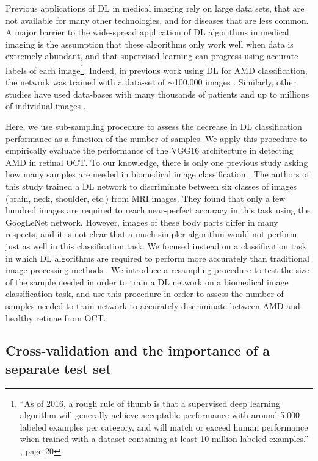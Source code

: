 Previous applications of DL in medical imaging rely on large data sets, that
are not available for many other technologies, and for diseases that are less
common. A major barrier to the wide-spread application of DL algorithms in
medical imaging is the assumption that these algorithms only work well when
data is extremely abundant, and that supervised learning can progress using
accurate labels of each image\footnote{``As of 2016, a rough rule of thumb is
that a supervised deep learning algorithm will generally achieve acceptable
performance with around 5,000 labeled examples per category, and will match or
exceed human performance when trained with a dataset containing at least 10
million labeled examples.'' \citep{Goodfellow-et-al-2016}, page 20}. Indeed, in
previous work using DL for AMD classification, the network was trained with a
data-set of $\sim$100,000 images \citep{lee2017deep}. Similarly, other studies
have used data-bases with many thousands of patients and up to millions of
individual images \citep{Kermany2018-bq}.

Here, we use sub-sampling procedure to assess the decrease in DL
classification performance as a function of the number of samples. We apply this
procedure to empirically evaluate the performance of the VGG16 architecture in
detecting AMD in retinal OCT. To our knowledge, there is only one previous
study asking how many samples are needed in biomedical image classification
\citep{Cho2015data_size}. The authors of this study trained a DL network to
discriminate between six classes of images (brain, neck, shoulder, etc.) from
MRI images. They found that only a few hundred images are required to reach
near-perfect accuracy in this task using the GoogLeNet network. However, images
of these body parts differ in many respects, and it is not clear that a much
simpler algorithm would not perform just as well in this classification task.
We focused instead on a classification task in which DL algorithms are required
to perform more accurately than traditional image processing methods
\citep{Lemaitre2016-gu}. We introduce a resampling procedure to test the size
of the sample needed in order to train a DL network on a biomedical image
classification task, and use this procedure in order to assess the number of
samples needed to train network to accurately discriminate between AMD and
healthy retinae from OCT.

\subsection{Cross-validation and the importance of a separate test set}

